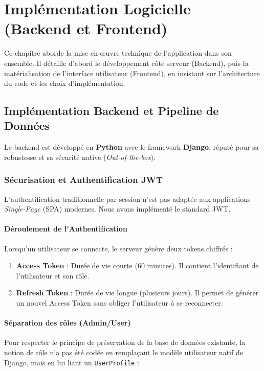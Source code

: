 \chapter{Implémentation Logicielle (Backend et Frontend)}

Ce chapitre aborde la mise en œuvre technique de l'application dans son ensemble. Il détaille d'abord le développement côté serveur (Backend), puis la matérialisation de l'interface utilisateur (Frontend), en insistant sur l'architecture du code et les choix d'implémentation.

\section{Implémentation Backend et Pipeline de Données}
Le backend est développé en \textbf{Python} avec le framework \textbf{Django}, réputé pour sa robustesse et sa sécurité native (\textit{Out-of-the-box}).

\subsection{Sécurisation et Authentification JWT}
L'authentification traditionnelle par session n'est pas adaptée aux applications \textit{Single-Page} (SPA) modernes. Nous avons implémenté le standard JWT\cite{jones2015jwt}.

\subsubsection{Déroulement de l'Authentification}
Lorsqu'un utilisateur se connecte, le serveur génère deux tokens chiffrés :
\begin{enumerate}
    \item \textbf{Access Token} : Durée de vie courte (60 minutes). Il contient l'identifiant de l'utilisateur et son rôle.
    \item \textbf{Refresh Token} : Durée de vie longue (plusieurs jours). Il permet de générer un nouvel Access Token sans obliger l'utilisateur à se reconnecter.
\end{enumerate}

\subsubsection{Séparation des rôles (Admin/User)}
Pour respecter le principe de préservation de la base de données existante, la notion de rôle n'a pas été codée en remplaçant le modèle utilisateur natif de Django, mais en lui liant un \texttt{UserProfile} :

